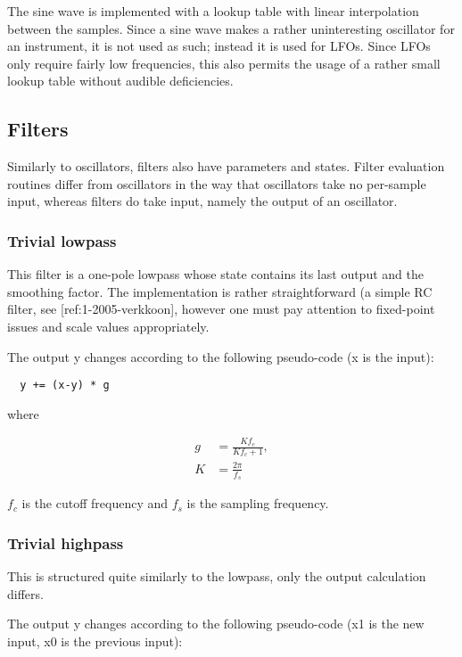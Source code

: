 \documentclass[10pt,a4paper,oneside]{article}
\begin{document}
The sine wave is implemented with a lookup table with linear interpolation between the samples. Since a sine wave makes a rather uninteresting oscillator for an instrument, it is not used as such; instead it is used for LFOs. Since LFOs only require fairly low frequencies, this also permits the usage of a rather small lookup table without audible deficiencies.

\subsection{Filters}


Similarly to oscillators, filters also have parameters and states. Filter evaluation routines differ from oscillators in the way that oscillators take no per-sample input, whereas filters do take input, namely the output of an oscillator.

\subsubsection{Trivial lowpass}


This filter is a one-pole lowpass whose state contains its last output and the smoothing factor. The implementation is rather straightforward (a simple RC filter, see [ref:1-2005-verkkoon], however one must pay attention to fixed-point issues and scale values appropriately.

The output y changes according to the following pseudo-code (x is the input):

\begin{verbatim}
  y += (x-y) * g
\end{verbatim}

where

\[
\begin{split}
  g &= \frac{K f_c}{K f_c + 1},\\
  K &= \frac{2 \pi}{f_s}
\end{split}
\]

$f_c$ is the cutoff frequency and $f_s$ is the sampling frequency.

\subsubsection{Trivial highpass}

This is structured quite similarly to the lowpass, only the output calculation differs.

The output y changes according to the following pseudo-code (x1 is the new input, x0 is the previous input):
\end{document}
